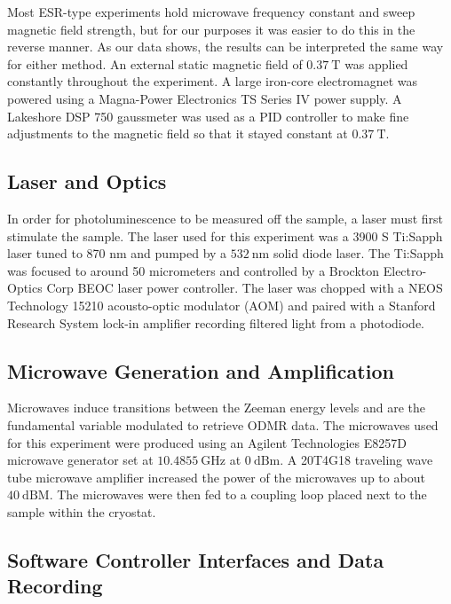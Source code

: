 \documentclass[oneside, noacknowlegments]{BYUPhys}
\begin{document}
Most ESR-type experiments hold microwave frequency constant and sweep magnetic field strength, but for our purposes it was easier to do this in the reverse manner. As our data shows, the results can be interpreted the same way for either method. An external static magnetic field of $0.37~\text{T}$ was applied constantly throughout the experiment. A large iron-core electromagnet was powered using a Magna-Power Electronics TS Series IV power supply. A Lakeshore DSP 750 gaussmeter was used as a PID controller to make fine adjustments to the magnetic field so that it stayed constant at $0.37~\text{T}$.

\subsection{Laser and Optics}

In order for photoluminescence to be measured off the sample, a laser must first stimulate the sample. The laser used for this experiment was a 3900 S Ti:Sapph laser tuned to 870 nm and pumped by a $532~\text{nm}$ solid diode laser. The Ti:Sapph was focused to around 50 micrometers and controlled by a Brockton Electro-Optics Corp BEOC laser power controller. The laser was chopped with a NEOS Technology 15210 acousto-optic modulator (AOM) and paired with a Stanford Research System lock-in amplifier recording filtered light from a photodiode.

\subsection{Microwave Generation and Amplification}

Microwaves induce transitions between the Zeeman energy levels and are the fundamental variable modulated to retrieve ODMR data. The microwaves used for this experiment were produced using an Agilent Technologies E8257D microwave generator set at $10.4855~\text{GHz}$ at $0~\text{dBm}$. A 20T4G18 traveling wave tube microwave amplifier increased the power of the microwaves up to about $40~\text{dBM}$. The microwaves were then fed to a coupling loop placed next to the sample within the cryostat.

\subsection{Software Controller Interfaces and Data Recording}
\end{document}
